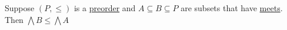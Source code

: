 
Suppose $(P,\leq)$ is a \href{doc/1 math/Seven Sketches in Compositionality/Chapter 1: Generative Effects/3 Preorders/1 Preorder}{preorder} and $A \subseteq B \subseteq P$ are subsets that have \href{doc/1 math/Seven Sketches in Compositionality/Chapter 1: Generative Effects/5 Meets and joins/1 Definition and basic examples/Meet and join}{meets}. Then $\bigwedge B \leq \bigwedge A$